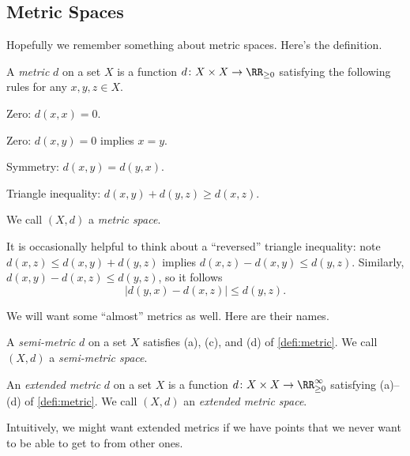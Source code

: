 \documentclass[../notes.tex]{subfiles}
\begin{document}
\subsection{Metric Spaces}
Hopefully we remember something about metric spaces. Here's the definition.
\begin{definition}[Metric] \label{defi:metric}
	A \textit{metric} $d$ on a set $X$ is a function $d\colon X\times X\to\RR_{\ge0}$ satisfying the following rules for any $x,y,z\in X$.
	\begin{listalph}
		\item Zero: $d(x,x)=0$.
		\item Zero: $d(x,y)=0$ implies $x=y$.
		\item Symmetry: $d(x,y)=d(y,x)$.
		\item Triangle inequality: $d(x,y)+d(y,z)\ge d(x,z)$.
	\end{listalph}
	We call $(X,d)$ a \textit{metric space}.
\end{definition}
\begin{remark}
	It is occasionally helpful to think about a ``reversed'' triangle inequality: note $d(x,z)\le d(x,y)+d(y,z)$ implies $d(x,z)-d(x,y)\le d(y,z)$. Similarly, $d(x,y)-d(x,z)\le d(y,z)$, so it follows
	\[|d(y,x)-d(x,z)|\le d(y,z).\]
\end{remark}
We will want some ``almost'' metrics as well. Here are their names.
\begin{defihelper} 
	A \textit{semi-metric} $d$ on a set $X$ satisfies (a), (c), and (d) of \autoref{defi:metric}. We call $(X,d)$ a \textit{semi-metric space}.
\end{defihelper}
\begin{defihelper} 
	An \textit{extended metric} $d$ on a set $X$ is a function $d\colon X\times X\to\RR_{\ge0}^\infty$ satisfying (a)--(d) of \autoref{defi:metric}. We call $(X,d)$ an \textit{extended metric space}.
\end{defihelper}
Intuitively, we might want extended metrics if we have points that we never want to be able to get to from other ones.
\end{document}
